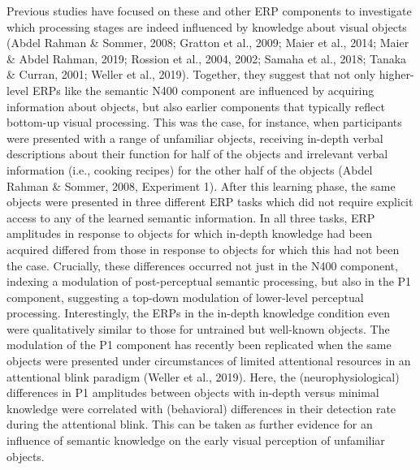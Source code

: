 \documentclass[
  english,
  doc,12pt,twoside,floatsintext]{apa7}
\begin{document}
Previous studies have focused on these and other ERP components to investigate which processing stages are indeed influenced by knowledge about visual objects (Abdel Rahman \& Sommer, 2008; Gratton et al., 2009; Maier et al., 2014; Maier \& Abdel Rahman, 2019; Rossion et al., 2004, 2002; Samaha et al., 2018; Tanaka \& Curran, 2001; Weller et al., 2019). Together, they suggest that not only higher-level ERPs like the semantic N400 component are influenced by acquiring information about objects, but also earlier components that typically reflect bottom-up visual processing. This was the case, for instance, when participants were presented with a range of unfamiliar objects, receiving in-depth verbal descriptions about their function for half of the objects and irrelevant verbal information (i.e., cooking recipes) for the other half of the objects (Abdel Rahman \& Sommer, 2008, Experiment 1). After this learning phase, the same objects were presented in three different ERP tasks which did not require explicit access to any of the learned semantic information. In all three tasks, ERP amplitudes in response to objects for which in-depth knowledge had been acquired differed from those in response to objects for which this had not been the case. Crucially, these differences occurred not just in the N400 component, indexing a modulation of post-perceptual semantic processing, but also in the P1 component, suggesting a top-down modulation of lower-level perceptual processing. Interestingly, the ERPs in the in-depth knowledge condition even were qualitatively similar to those for untrained but well-known objects. The modulation of the P1 component has recently been replicated when the same objects were presented under circumstances of limited attentional resources in an attentional blink paradigm (Weller et al., 2019). Here, the (neurophysiological) differences in P1 amplitudes between objects with in-depth versus minimal knowledge were correlated with (behavioral) differences in their detection rate during the attentional blink. This can be taken as further evidence for an influence of semantic knowledge on the early visual perception of unfamiliar objects.
\end{document}
